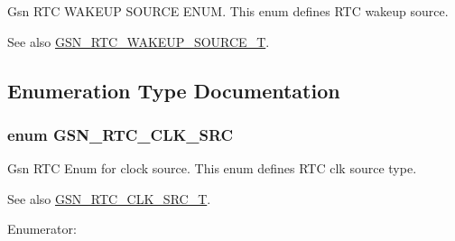 Gsn RTC WAKEUP SOURCE ENUM. This enum defines RTC wakeup source. 

\begin{DoxySeeAlso}{See also}
\hyperlink{a00651_gaf7c5ef16a16838e7cbfc58bda46355bc}{GSN\_\-RTC\_\-WAKEUP\_\-SOURCE\_\-T}. 
\end{DoxySeeAlso}


\subsection{Enumeration Type Documentation}
\hypertarget{a00651_gaace509e7754aacb14b76f77e68fa9b2a}{
\subsubsection[{GSN\_\-RTC\_\-CLK\_\-SRC}]{\setlength{\rightskip}{0pt plus 5cm}enum {\bf GSN\_\-RTC\_\-CLK\_\-SRC}}}
\label{a00651_gaace509e7754aacb14b76f77e68fa9b2a}


Gsn RTC Enum for clock source. This enum defines RTC clk source type. 

\begin{DoxySeeAlso}{See also}
\hyperlink{a00651_gadb97e494297aadf7b5dda5f239d96c80}{GSN\_\-RTC\_\-CLK\_\-SRC\_\-T}. 
\end{DoxySeeAlso}
\begin{Desc}
\item[Enumerator: ]\par
\begin{description}
\item[{\em 
\hypertarget{a00651_ggaace509e7754aacb14b76f77e68fa9b2aa103f27c2edcc660a4bd726cfa53df43b}{
GSN\_\-RTC\_\-CLK\_\-SRC\_\-LP\_\-RC}
\label{a00651_ggaace509e7754aacb14b76f77e68fa9b2aa103f27c2edcc660a4bd726cfa53df43b}
}]\item[{\em 
\hypertarget{a00651_ggaace509e7754aacb14b76f77e68fa9b2aac0cf76a0773079a58adbc64828e8aa6f}{
GSN\_\-RTC\_\-CLK\_\-SRC\_\-LP\_\-XTAL}
\label{a00651_ggaace509e7754aacb14b76f77e68fa9b2aac0cf76a0773079a58adbc64828e8aa6f}
}]\end{description}
\end{Desc}



